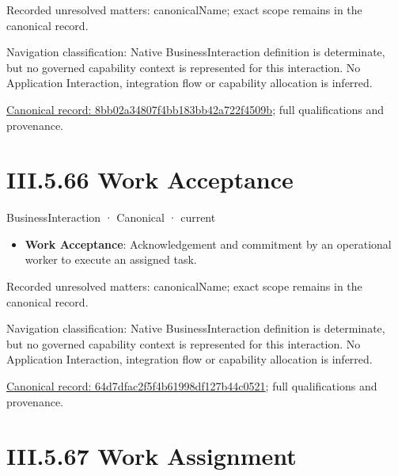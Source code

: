 {\small Recorded unresolved matters: canonicalName; exact scope remains in the canonical record.}\par
{\small Navigation classification: Native BusinessInteraction definition is determinate, but no governed capability context is represented for this interaction. No Application Interaction, integration flow or capability allocation is inferred.}\par
{\footnotesize \href{../../../../../../../../continuum/business/business-interaction/8bb02a34807f4bb183bb42a722f4509b.md}{Canonical record: 8bb02a34807f4bb183bb42a722f4509b}; full qualifications and provenance.}\par
\section*{III.5.66 Work Acceptance}
\label{navigation:III.5.66}

\label{element:64d7dfac2f5f4b61998df127b44c0521}
{\small BusinessInteraction · Canonical · current}\par

\begin{itemize}


\item \textbf{Work Acceptance}: Acknowledgement and commitment by an operational worker to execute an assigned task.

\end{itemize}

{\small Recorded unresolved matters: canonicalName; exact scope remains in the canonical record.}\par
{\small Navigation classification: Native BusinessInteraction definition is determinate, but no governed capability context is represented for this interaction. No Application Interaction, integration flow or capability allocation is inferred.}\par
{\footnotesize \href{../../../../../../../../continuum/business/business-interaction/64d7dfac2f5f4b61998df127b44c0521.md}{Canonical record: 64d7dfac2f5f4b61998df127b44c0521}; full qualifications and provenance.}\par
\section*{III.5.67 Work Assignment}
\label{navigation:III.5.67}

